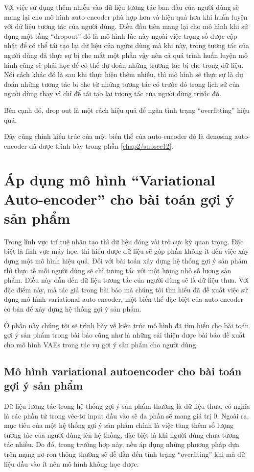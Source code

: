     Với việc sử dụng thêm nhiễu vào dữ liệu tương tác ban đầu của người dùng sẽ mang lại cho mô hình auto-encoder phù hợp hơn và hiệu quả hơn khi huấn luyện với dữ liệu tương tác của người dùng.
    Điều đầu tiên mang lại cho mô hình khi sử dụng một tầng ``dropout'' đó là mô hình lúc này ngoài việc trọng số được cập nhật để có thể tái tạo lại dữ liệu của ngừoi dùng mà khi này, trong tương tác của người dùng đã thực sự bị che mất một phần vậy nên cả quá trình huấn luyện mô hình cũng sẽ phải học để có thể dự đoán những trương tác bị che trong dữ liệu. Nói cách khác đó là sau khi thực hiện thêm nhiễu, thì mô hình sẽ thực sự là dự đoán những tương tác bị che từ những tương tác có trước đó trong lịch sử của người dùng thay vì chỉ để tái tạo lại tương tác của người dùng trước đó.

    Bên cạnh đó, drop out là một cách hiệu quả để ngăn tình trạng ``overfitting'' hiệu quả.

    Đây cũng chính kiến trúc của một biến thể của auto-encoder đó là denosing auto-encoder đã được trình bày trong phần \ref{chap2/subsec12}.
    

    

\section{Áp dụng mô hình ``Variational Auto-encoder'' cho bài toán gợi ý sản phẩm}
    Trong lĩnh vực trí tuệ nhân tạo thì dữ liệu đóng vài trò cực kỳ quan trọng.
    Đặc biệt là lĩnh vực máy học, thì hiểu được dữ liệu sẽ góp phần không ít đến việc xây dựng một mô hình hiệu quả. 
    Đối với bài toán xây dựng hệ thống gợi ý sản phẩm thì thực tế mỗi người dùng sẽ chỉ tương tác với một lượng nhỏ số lượng sản phẩm.
    Điều này dẫn đến dữ liệu tương tác của người dùng sẽ là dữ liệu thưa.
    Với đặc điểm này, mà tác giả trong bài báo \cite{mvae} mà chúng tôi tìm hiểu đã đề xuất việc sử dụng mô hình variational auto-encoder, một biến thể đặc biệt của auto-encoder cơ bản để xây dựng hệ thống gợi ý sản phẩm.

    Ở phần này chúng tôi sẽ trình bày về kiến trúc mô hình đã tìm hiểu cho bài toán gợi ý sản phẩm trong bài báo cũng như là những cải thiện được bài báo đề xuất cho mô hình VAEs trong tác vụ gợi ý sản phẩm cho người dùng. 

    \subsection{Mô hình variational autoencoder cho bài toán gợi ý sản phẩm}
    Dữ liệu lương tác trong hệ thống gợi ý sản phẩm thường là dữ liệu thưa, có nghĩa là các phần tử trong véc-tơ input đầu vào sẽ đa phần sẽ mang giá trị 0. 
    Ngoài ra, mục tiêu của một hệ thống gợi ý sản phẩm chính là việc tăng thêm số lượng tương tác của người dùng lên hệ thống, đặc biệt là khi người dùng chưa tương tác nhiều.
    Do đó, trong trường hợp này, nếu áp dụng những phương pháp dựa trên mạng nơ-ron thông thường sẽ dễ dẫn đến tình trạng ``overfiting'' khi mà dữ liệu đầu vào ít nên mô hình không học được.
    
